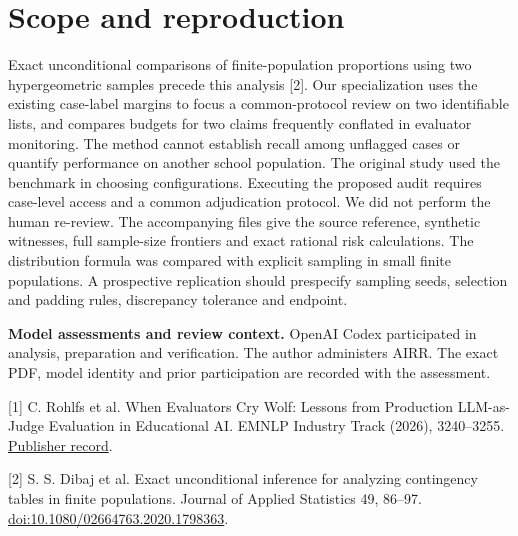 \documentclass[11pt]{article}
\begin{document}
\section{Scope and reproduction}
Exact unconditional comparisons of finite-population proportions using two hypergeometric samples precede this analysis [2]. Our specialization uses the existing case-label margins to focus a common-protocol review on two identifiable lists, and compares budgets for two claims frequently conflated in evaluator monitoring. The method cannot establish recall among unflagged cases or quantify performance on another school population. The original study used the benchmark in choosing configurations. Executing the proposed audit requires case-level access and a common adjudication protocol. We did not perform the human re-review.
The accompanying files give the source reference, synthetic witnesses, full sample-size frontiers and exact rational risk calculations. The distribution formula was compared with explicit sampling in small finite populations. A prospective replication should prespecify sampling seeds, selection and padding rules, discrepancy tolerance and endpoint.

\textbf{Model assessments and review context.} OpenAI Codex participated in analysis, preparation and verification. The author administers AIRR. The exact PDF, model identity and prior participation are recorded with the assessment.
\par\small
[1] C. Rohlfs et al. When Evaluators Cry Wolf: Lessons from Production LLM-as-Judge Evaluation in Educational AI. EMNLP Industry Track (2026), 3240--3255. \href{https://aclanthology.org/2026.emnlp-industry.193/}{Publisher record}.

[2] S. S. Dibaj et al. Exact unconditional inference for analyzing contingency tables in finite populations. Journal of Applied Statistics 49, 86--97. \href{https://doi.org/10.1080/02664763.2020.1798363}{doi:10.1080/02664763.2020.1798363}.
\end{document}
